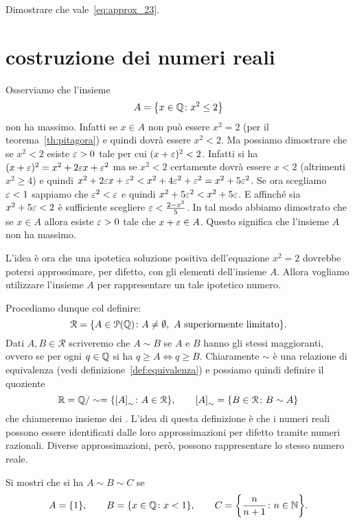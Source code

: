 \begin{exercise}
Dimostrare che vale~\eqref{eq:approx_23}.
\end{exercise}  


\section{costruzione dei numeri reali}

Osserviamo che l'insieme 
\[
 A = {\left\{ x\in {\mathbb Q} \colon x^2 \le 2 \right\}}  
\]
non ha massimo. 
Infatti se $x\in A$ non può essere $x^2=2$ (per il teorema~\ref{th:pitagora})
e quindi dovrà essere $x^2<2$. 
Ma possiamo dimostrare che se $x^2<2$ esiste $\varepsilon>0$ tale per cui $(x+\varepsilon)^2<2$. 
Infatti si ha $(x+\varepsilon)^2 = x^2 + 2\varepsilon x + \varepsilon^2$
ma se $x^2<2$ certamente dovrà essere $x<2$ (altrimenti $x^2\ge 4$)
e quindi $x^2+2\varepsilon x+\varepsilon^2 < x^2+ 4\varepsilon^2+\varepsilon^2 = x^2+5\varepsilon^2$.
Se ora scegliamo $\varepsilon<1$ sappiamo che $\varepsilon^2<\varepsilon$ 
e quindi $x^2+5\varepsilon^2 < x^2 + 5\varepsilon$. 
E affinché sia $x^2 + 5\varepsilon < 2$ è sufficiente scegliere 
$\varepsilon < \frac{2-x^2}{5}$. 
In tal modo abbiamo dimostrato che se $x\in A$ allora esiste 
$\varepsilon>0$ tale che $x+\varepsilon \in A$. 
Questo significa che l'insieme $A$ non ha massimo.

L'idea è ora che una ipotetica soluzione positiva dell'equazione $x^2=2$ 
dovrebbe potersi approssimare, per difetto, con gli elementi dell'insieme $A$.
Allora vogliamo utilizzare l'insieme $A$ per rappresentare un tale ipotetico numero.

Procediamo dunque col definire:
\[
\mathcal R = {\left\{ A \in \mathcal P({\mathbb Q})\colon A\neq \emptyset, \text{ $A$ superiormente 
limitato} \right\}}.
\]
Dati $A,B\in \mathcal R$ scriveremo che $A\sim B$ 
se $A$ e $B$ hanno gli stessi maggioranti, ovvero
se per ogni $q\in {\mathbb Q}$ si ha $q\ge A \iff q\ge B$.
Chiaramente $\sim$ è una relazione di equivalenza (vedi definizione~\ref{def:equivalenza})
e possiamo quindi definire il quoziente
\[
  {\mathbb R} = {\mathbb Q} / \sim = {\left\{ {\left[ A \right]}_\sim\colon A\in \mathcal R \right\}},
  \qquad 
  {\left[ A \right]}_\sim = {\left\{ B\in \mathcal R\colon B\sim A \right\}}
\]
che chiameremo insieme dei .
L'idea di questa definizione è che i numeri reali 
possono essere identificati dalle loro approssimazioni 
per difetto tramite numeri razionali. 
Diverse approssimazioni, però, possono rappresentare 
lo stesso numero reale.

\begin{exercise}
  Si mostri che si ha $A \sim B \sim C$ se
  \[
  A = {\left\{ 1 \right\}}, \qquad 
  B = {\left\{ x\in {\mathbb Q}\colon x<1 \right\}}, \qquad
  C = {\left\{ \frac{n}{n+1}\colon n\in {\mathbb N} \right\}}.
  \]
\end{exercise}

